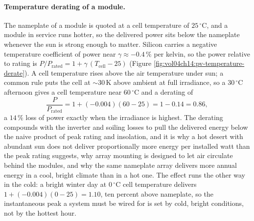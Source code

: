 \paragraph{Temperature derating of a module.} The nameplate of a module is
quoted at a cell temperature of $25\,{}^{\circ}\mathrm{C}$, and a module in
service runs hotter, so the delivered power sits below the nameplate whenever
the sun is strong enough to matter. Silicon carries a negative temperature
coefficient of power near $\gamma \approx -0.4\,\%$ per kelvin, so the power
relative to rating is $P/P_{\text{rated}} = 1 + \gamma\,(T_{\text{cell}} -
25)$ (Figure \ref{fig:vol04ch14:pv-temperature-derate}). A cell temperature
rises above the air temperature under sun; a common rule puts the cell at
$\sim 30\,\si{\kelvin}$ above ambient at full irradiance, so a
$30\,{}^{\circ}\mathrm{C}$ afternoon gives a cell temperature near
$60\,{}^{\circ}\mathrm{C}$ and a derating of
\[
\frac{P}{P_{\text{rated}}} = 1 + (-0.004)(60 - 25) = 1 - 0.14 = 0.86,
\]
a $14\,\%$ loss of power exactly when the irradiance is highest. The
derating compounds with the inverter and soiling losses to pull the delivered
energy below the naive product of peak rating and insolation, and it is why a
hot desert with abundant sun does not deliver proportionally more energy per
installed watt than the peak rating suggests, why array mounting is designed
to let air circulate behind the modules, and why the same nameplate array
delivers more annual energy in a cool, bright climate than in a hot one. The
effect runs the other way in the cold: a bright winter day at
$0\,{}^{\circ}\mathrm{C}$ cell temperature delivers $1 + (-0.004)(0 - 25) =
1.10$, ten percent above nameplate, so the instantaneous peak a system must be
wired for is set by cold, bright conditions, not by the hottest hour.

